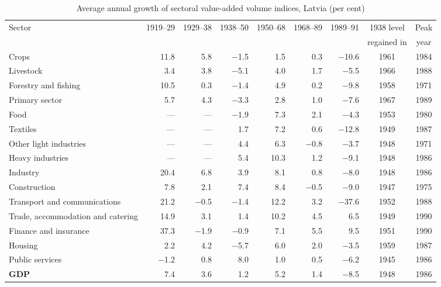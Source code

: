 \begin{table}[htbp]
\centering\scriptsize\setlength{\tabcolsep}{3pt}
\caption{Average annual growth of sectoral value-added volume indices, Latvia (per cent)}
\label{tab:sectoral}
\begin{threeparttable}
\begin{tabular}{lrrrrrrcc}
\toprule
Sector & 1919--29 & 1929--38 & 1938--50 & 1950--68 & 1968--89 & 1989--91 & 1938 level & Peak \\
& & & & & & & regained in & year \\
\midrule
Crops & 11.8 & 5.8 & $-$1.5 & 1.5 & 0.3 & $-$10.6 & 1961 & 1984 \\
Livestock & 3.4 & 3.8 & $-$5.1 & 4.0 & 1.7 & $-$5.5 & 1966 & 1988 \\
Forestry and fishing & 10.5 & 0.3 & $-$1.4 & 4.9 & 0.2 & $-$9.8 & 1958 & 1971 \\
\quad Primary sector & 5.7 & 4.3 & $-$3.3 & 2.8 & 1.0 & $-$7.6 & 1967 & 1989 \\
\midrule
Food & --- & --- & $-$1.9 & 7.3 & 2.1 & $-$4.3 & 1953 & 1980 \\
Textiles & --- & --- & 1.7 & 7.2 & 0.6 & $-$12.8 & 1949 & 1987 \\
Other light industries & --- & --- & 4.4 & 6.3 & $-$0.8 & $-$3.7 & 1948 & 1971 \\
Heavy industries & --- & --- & 5.4 & 10.3 & 1.2 & $-$9.1 & 1948 & 1986 \\
\quad Industry & 20.4 & 6.8 & 3.9 & 8.1 & 0.8 & $-$8.0 & 1948 & 1986 \\
\midrule
Construction & 7.8 & 2.1 & 7.4 & 8.4 & $-$0.5 & $-$9.0 & 1947 & 1975 \\
Transport and communications & 21.2 & $-$0.5 & $-$1.4 & 12.2 & 3.2 & $-$37.6 & 1952 & 1988 \\
Trade, accommodation and catering & 14.9 & 3.1 & 1.4 & 10.2 & 4.5 & 6.5 & 1949 & 1990 \\
Finance and insurance & 37.3 & $-$1.9 & $-$0.9 & 7.1 & 5.5 & 9.5 & 1951 & 1990 \\
Housing & 2.2 & 4.2 & $-$5.7 & 6.0 & 2.0 & $-$3.5 & 1959 & 1987 \\
Public services & $-$1.2 & 0.8 & 8.0 & 1.0 & 0.5 & $-$6.2 & 1945 & 1986 \\
\midrule
\textbf{GDP} & 7.4 & 3.6 & 1.2 & 5.2 & 1.4 & $-$8.5 & 1948 & 1986 \\
\bottomrule
\end{tabular}
\begin{tablenotes}

\end{tablenotes}
\end{threeparttable}
\end{table}
